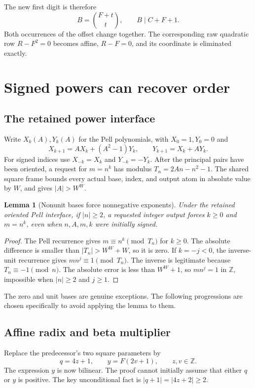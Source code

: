 \documentclass[11pt]{article}
\newtheorem{lemma}[theorem]{Lemma}
\theoremstyle{remark}\newtheorem{remark}[theorem]{Remark}
\newcommand{\Z}{\mathbb Z}\newcommand{\N}{\mathbb N}
\begin{document}
The new first digit is therefore
\begin{equation}\label{eq:newB}
 B=\binom{F+t}{t},\qquad B\mid C+F+1.
\end{equation}
Both occurrences of the offset change together. The corresponding raw
quadratic row $R-F^2=0$ becomes affine, $R-F=0$, and its coordinate is
eliminated exactly.

\section{Signed powers can recover order}

\subsection{The retained power interface}

Write $X_k(A),Y_k(A)$ for the Pell polynomials, with $X_0=1,Y_0=0$ and
\[
 X_{k+1}=AX_k+(A^2-1)Y_k,\qquad
 Y_{k+1}=X_k+AY_k.
\]
For signed indices use $X_{-k}=X_k$ and $Y_{-k}=-Y_k$. After the
principal pairs have been oriented, a request for $m=n^k$ has modulus
$T_n=2An-n^2-1$. The shared square frame bounds every actual base,
index, and output atom in absolute value by $W$, and gives
$|A|>W^W$.

\begin{lemma}[Nonunit bases force nonnegative exponents]\label{lem:power}
Under the retained oriented Pell interface, if $|n|\ge2$, a requested
integer output forces $k\ge0$ and $m=n^k$, even when $n,A,m,k$ were
initially signed.
\end{lemma}
\begin{proof}
The Pell recurrence gives $m\equiv n^k\pmod{T_n}$ for $k\ge0$.
The absolute difference is smaller than $|T_n|>W^W+W$, so it is zero.
If $k=-j<0$, the inverse-unit recurrence gives
$mn^j\equiv1\pmod{T_n}$. The inverse is legitimate because
$T_n\equiv-1\pmod n$. The absolute error is less than $W^W+1$,
so $mn^j=1$ in $\Z$, impossible when $|n|\ge2$ and $j\ge1$.
\end{proof}

The zero and unit bases are genuine exceptions. The following progressions
are chosen specifically to avoid applying the lemma to them.

\subsection{Affine radix and beta multiplier}

Replace the predecessor's two square parameters by
\begin{equation}\label{eq:affine}
             q=4z+1,\qquad y=F(2v+1),\qquad z,v\in\Z.
\end{equation}
The expression $y$ is now bilinear. The proof cannot initially assume
that either $q$ or $y$ is positive. The key unconditional fact is
$|q+1|=|4z+2|\ge2$.
\end{document}
